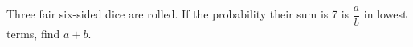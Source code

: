 Three fair six-sided dice are rolled. If the probability their sum is 7 is $\dfrac{a}{b}$ in lowest terms, find $a+b$.
